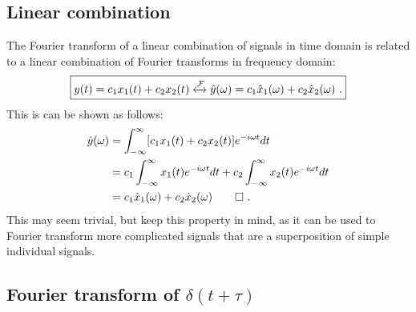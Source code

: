 \subsection{Linear combination}
The Fourier transform of a linear combination of signals in time domain is related to a linear combination of Fourier transforms in frequency domain:
\begin{equation}
\boxed{
y(t)=c_1 x_1(t)  + c_2 x_2(t) \xleftrightarrow{\mathcal{F}} \hat{y}(\omega) = c_1\hat{x}_1(\omega)+c_2\hat{x}_2(\omega)\,\,.
}
\end{equation}
This is can be shown as follows:
\begin{align}
\hat{y}(\omega) &= \int_{-\infty}^{\infty} [c_1 x_1(t)+c_2 x_2(t)] e^{-i\omega t} dt \\
&= c_1\int_{-\infty}^{\infty} x_1(t) e^{-i\omega t} dt + c_2\int_{-\infty}^{\infty} x_2(t) e^{-i\omega t} dt \\ 
&=  c_1\hat{x}_1(\omega)+c_2\hat{x}_2(\omega)\qed\,\,.
\end{align}
This may seem trivial, but keep this property in mind, as it can be used to Fourier transform more complicated signals that are a superposition of simple individual signals.


\subsection{Fourier transform of $\delta(t+\tau)$}

